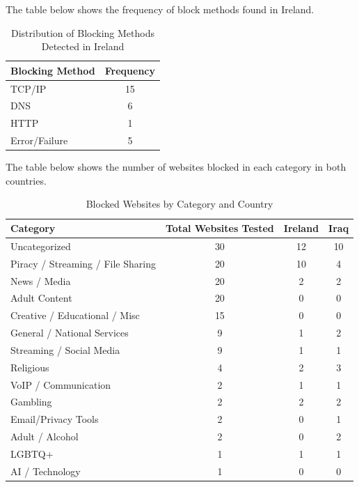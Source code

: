 The table below shows the frequency of block methods found in Ireland.

\begin{table}[H]
\centering
\caption{Distribution of Blocking Methods Detected in Ireland}
\begin{tabular}{lc}
\toprule
\textbf{Blocking Method} & \textbf{Frequency} \\
\midrule
TCP/IP  & 15 \\
DNS & 6 \\
HTTP & 1 \\
Error/Failure & 5 \\
\bottomrule
\end{tabular}
\label{tab:ireland_blocking_methods}
\end{table}

The table below shows the number of websites blocked in each category in both countries.

\begin{table}[H]
\centering
\caption{Blocked Websites by Category and Country}
\begin{tabular}{lccc}
\toprule
\textbf{Category} & \textbf{Total Websites Tested} & \textbf{Ireland} & \textbf{Iraq} \\
\midrule
Uncategorized                      & 30 & 12 & 10 \\
Piracy / Streaming / File Sharing  & 20 & 10 & 4 \\
News / Media                       & 20 & 2 & 2 \\
Adult Content                      & 20 & 0 & 0 \\
Creative / Educational / Misc      & 15 & 0 & 0 \\
General / National Services        & 9 & 1 & 2 \\
Streaming / Social Media           & 9 & 1 & 1 \\
Religious                          & 4 & 2 & 3 \\
VoIP / Communication               & 2 & 1 & 1 \\
Gambling                           & 2 & 2 & 2 \\
Email/Privacy Tools                & 2 & 0 & 1 \\
Adult / Alcohol                    & 2 & 0 & 2 \\
LGBTQ+                             & 1 & 1 & 1 \\
AI / Technology                    & 1 & 0 & 0 \\
\bottomrule
\end{tabular}
\label{tab:category_block}
\end{table}

